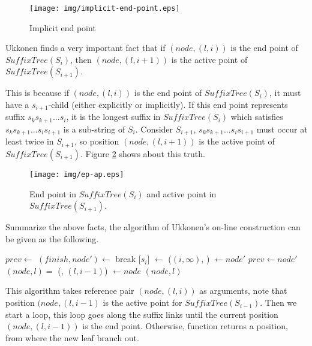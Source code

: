 \documentclass[UTF8]{article}
\begin{document}
\begin{figure}[htbp]
  \centering
  \texttt{[image: img/implicit-end-point.eps]}
  \caption{Implicit end point}
  \label{fig:implicit-end-point}
\end{figure}

Ukkonen finds a very important fact that if $(node, (l, i))$ is the end
point of $SuffixTree(S_i)$, then $(node, (l, i+1))$ is the active point of
$SuffixTree(S_{i+1})$.

This is because if $(node, (l, i))$ is the end point of $SuffixTree(S_i)$,
it must have a $s_{i+1}$-child (either explicitly or implicitly).
If this end point represents suffix $s_ks_{k+1}...s_i$, it is the longest
suffix in $SuffixTree(S_i)$ which satisfies $s_ks_{k+1}...s_is_{i+1}$ is a sub-string
of $S_i$. Consider $S_{i+1}$, $s_ks_{k+1}...s_is_{i+1}$ must occur at least
twice in $S_{i+1}$, so position $(node, (l, i+1))$ is the active point of
$SuffixTree(S_{i+1})$. Figure \ref{fig:ep-ap} shows about this truth.

\begin{figure}[htbp]
  \centering
  \texttt{[image: img/ep-ap.eps]}
  \caption{End point in $SuffixTree(S_i)$ and active point in $SuffixTree(S_{i+1})$.}
  \label{fig:ep-ap}
\end{figure}

Summarize the above facts, the algorithm of Ukkonen's on-line construction can
be given as the following.

\begin{algorithmic}[1]
  \State $prev \gets$   %
  \Loop {}
    \State $(finish, node') \gets$ 
      \State break
    \EndIf
    \State {}[$s_i$] $\gets$ ($(i, \infty)$, )
    \State {} $\gets node'$
    \State $prev \gets node'$
    \State $(node, l) = $ (, $(l, i-1)$)
  \EndLoop
  \State {} $\gets node$
  \State \Return $(node, l)$ 
\EndFunction
\end{algorithmic}

This algorithm takes reference pair $(node, (l, i))$ as arguments, note that
position $(node, (l, i-1)$ is the active point for $SuffixTree(S_{i-1})$.
Then we start a loop, this loop goes along the suffix links until
the current position $(node, (l, i-1))$ is the end point. Otherwise,
function  returns a position, from
where the new leaf branch out.
\end{document}
